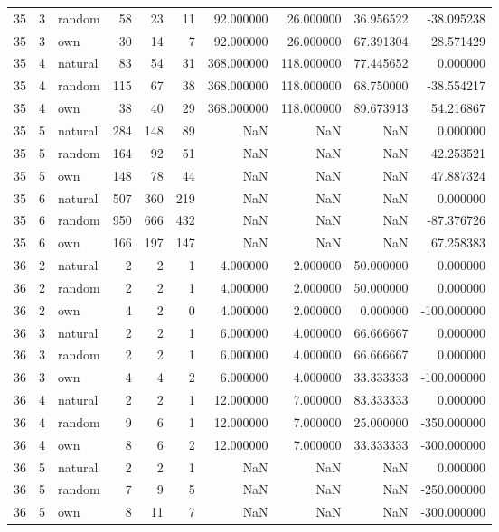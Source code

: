 \begin{table}[htbp]
\begin{tabular}{rrlrrrrrrr}
35 & 3 & random & 58 & 23 & 11 & 92.000000 & 26.000000 & 36.956522 & -38.095238 \\
35 & 3 & own & 30 & 14 & 7 & 92.000000 & 26.000000 & 67.391304 & 28.571429 \\
35 & 4 & natural & 83 & 54 & 31 & 368.000000 & 118.000000 & 77.445652 & 0.000000 \\
35 & 4 & random & 115 & 67 & 38 & 368.000000 & 118.000000 & 68.750000 & -38.554217 \\
35 & 4 & own & 38 & 40 & 29 & 368.000000 & 118.000000 & 89.673913 & 54.216867 \\
35 & 5 & natural & 284 & 148 & 89 & NaN & NaN & NaN & 0.000000 \\
35 & 5 & random & 164 & 92 & 51 & NaN & NaN & NaN & 42.253521 \\
35 & 5 & own & 148 & 78 & 44 & NaN & NaN & NaN & 47.887324 \\
35 & 6 & natural & 507 & 360 & 219 & NaN & NaN & NaN & 0.000000 \\
35 & 6 & random & 950 & 666 & 432 & NaN & NaN & NaN & -87.376726 \\
35 & 6 & own & 166 & 197 & 147 & NaN & NaN & NaN & 67.258383 \\
36 & 2 & natural & 2 & 2 & 1 & 4.000000 & 2.000000 & 50.000000 & 0.000000 \\
36 & 2 & random & 2 & 2 & 1 & 4.000000 & 2.000000 & 50.000000 & 0.000000 \\
36 & 2 & own & 4 & 2 & 0 & 4.000000 & 2.000000 & 0.000000 & -100.000000 \\
36 & 3 & natural & 2 & 2 & 1 & 6.000000 & 4.000000 & 66.666667 & 0.000000 \\
36 & 3 & random & 2 & 2 & 1 & 6.000000 & 4.000000 & 66.666667 & 0.000000 \\
36 & 3 & own & 4 & 4 & 2 & 6.000000 & 4.000000 & 33.333333 & -100.000000 \\
36 & 4 & natural & 2 & 2 & 1 & 12.000000 & 7.000000 & 83.333333 & 0.000000 \\
36 & 4 & random & 9 & 6 & 1 & 12.000000 & 7.000000 & 25.000000 & -350.000000 \\
36 & 4 & own & 8 & 6 & 2 & 12.000000 & 7.000000 & 33.333333 & -300.000000 \\
36 & 5 & natural & 2 & 2 & 1 & NaN & NaN & NaN & 0.000000 \\
36 & 5 & random & 7 & 9 & 5 & NaN & NaN & NaN & -250.000000 \\
36 & 5 & own & 8 & 11 & 7 & NaN & NaN & NaN & -300.000000 \\

\end{tabular}
\end{table}
